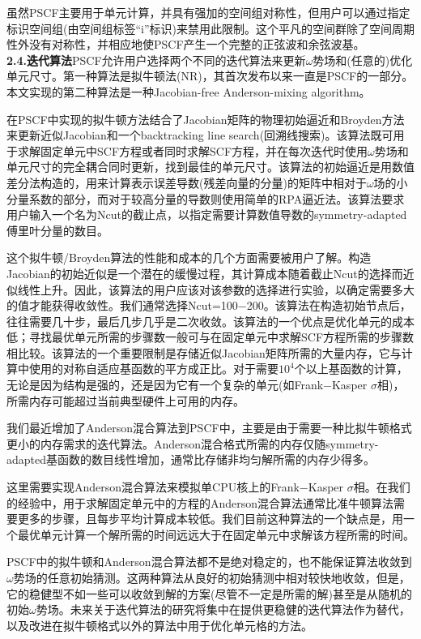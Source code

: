 \documentclass[12pt,a4paper]{article}
\begin{document}
虽然PSCF主要用于单元计算，并具有强加的空间组对称性，但用户可以通过指定标识空间组(由空间组标签“i”标识)来禁用此限制。这个平凡的空间群除了空间周期性外没有对称性，并相应地使PSCF产生一个完整的正弦波和余弦波基。\\
\textbf{2.4.迭代算法}PSCF允许用户选择两个不同的迭代算法来更新$\omega$势场和(任意的)优化单元尺寸。第一种算法是拟牛顿法(NR)，其首次发布以来一直是PSCF的一部分。本文实现的第二种算法是一种Jacobian-free Anderson-mixing algorithm。

在PSCF中实现的拟牛顿方法结合了Jacobian矩阵的物理初始逼近和Broyden方法来更新近似Jacobian和一个backtracking line  search(回溯线搜索)。该算法既可用于求解固定单元中SCF方程或者同时求解SCF方程，并在每次迭代时使用$\omega$势场和单元尺寸的完全耦合同时更新，找到最佳的单元尺寸。该算法的初始逼近是用数值差分法构造的，用来计算表示误差导数(残差向量的分量)的矩阵中相对于$\omega$场的小分量系数的部分，而对于较高分量的导数则使用简单的RPA逼近法。该算法要求用户输入一个名为Ncut的截止点，以指定需要计算数值导数的symmetry-adapted傅里叶分量的数目。

这个拟牛顿/Broyden算法的性能和成本的几个方面需要被用户了解。构造Jacobian的初始近似是一个潜在的缓慢过程，其计算成本随着截止Ncut的选择而近似线性上升。因此，该算法的用户应该对该参数的选择进行实验，以确定需要多大的值才能获得收敛性。我们通常选择Ncut=100−200。该算法在构造初始节点后，往往需要几十步，最后几步几乎是二次收敛。该算法的一个优点是优化单元的成本低；寻找最优单元所需的步骤数一般可与在固定单元中求解SCF方程所需的步骤数相比较。该算法的一个重要限制是存储近似Jacobian矩阵所需的大量内存，它与计算中使用的对称自适应基函数的平方成正比。对于需要$10^4$个以上基函数的计算，无论是因为结构是强的，还是因为它有一个复杂的单元(如Frank−Kasper $\sigma$相)，所需内存可能超过当前典型硬件上可用的内存。

我们最近增加了Anderson混合算法到PSCF中，主要是由于需要一种比拟牛顿格式更小的内存需求的迭代算法。Anderson混合格式所需的内存仅随symmetry-adapted基函数的数目线性增加，通常比存储非均匀解所需的内存少得多。

这里需要实现Anderson混合算法来模拟单CPU核上的Frank−Kasper $\sigma$相。在我们的经验中，用于求解固定单元中的方程的Anderson混合算法通常比准牛顿算法需要更多的步骤，且每步平均计算成本较低。我们目前这种算法的一个缺点是，用一个最优单元计算一个解所需的时间远远大于在固定单元中求解该方程所需的时间。

PSCF中的拟牛顿和Anderson混合算法都不是绝对稳定的，也不能保证算法收敛到$\omega$势场的任意初始猜测。这两种算法从良好的初始猜测中相对较快地收敛，但是，它的稳健型不如一些可以收敛到解的方案(尽管不一定是所需的解)甚至是从随机的初始$\omega$势场。未来关于迭代算法的研究将集中在提供更稳健的迭代算法作为替代，以及改进在拟牛顿格式以外的算法中用于优化单元格的方法。
\end{document}
